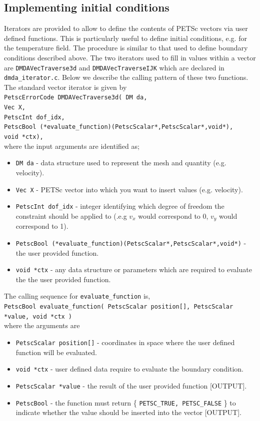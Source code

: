 \documentclass[paper=a4, fontsize=11pt,twoside]{scrartcl}
\newcommand{\shellcmd}[1]{\\\indent\indent\texttt{\hspace{5mm}\footnotesize #1}\\}
\newcommand{\unix}[1]{\texttt{\footnotesize #1}}
\begin{document}
{{\subsection{Implementing initial conditions}
Iterators are provided to allow to define the contents of PETSc vectors via user defined functions. This is particularly useful to define initial conditions, e.g. for the temperature field. The procedure is similar to that used to define boundary conditions described above. The two iterators used to fill in values within a vector are \unix{DMDAVecTraverse3d} and \unix{DMDAVecTraverseIJK} which are declared in \unix{dmda\_iterator.c}. Below we describe the calling pattern of these two functions.
\\[8pt]
The standard vector iterator is given by
\shellcmd{PetscErrorCode DMDAVecTraverse3d( \newline
  DM da, \\
  Vec X, \\
  PetscInt dof\_idx, \\
  PetscBool (*evaluate\_function)(PetscScalar*,PetscScalar*,void*), \\
  void *ctx),} 
 where the input arguments are identified as;
\begin{itemize}
\item[] \unix{DM da} - data structure used to represent the mesh and quantity (e.g. velocity).
\item[] \unix{Vec X} - PETSc vector into which you want to insert values (e.g. velocity).
\item[] \unix{PetscInt dof\_idx} - integer identifying which degree of freedom the constraint should be applied to (.e.g $v_x$ would correspond to 0, $v_y$ would correspond to 1).
\item[] \unix{PetscBool (*evaluate\_function)(PetscScalar*,PetscScalar*,void*)} - the user provided function.
\item[] \unix{void *ctx} - any data structure or parameters which are required to evaluate the the user provided function.
\end{itemize}
The calling sequence for \unix{evaluate\_function} is,
\shellcmd{PetscBool evaluate\_function( PetscScalar position[], PetscScalar *value, void *ctx )}
where the arguments are
\begin{itemize}
\item[] \unix{PetscScalar position[]} - coordinates in space where the user defined function will be evaluated.
\item[] \unix{void *ctx} - user defined data require to evaluate the boundary condition.
\item[] \unix{PetscScalar *value} - the result of the user provided function [OUTPUT].
\item[] \unix{PetscBool} - the function must return \{ \unix{PETSC\_TRUE, PETSC\_FALSE} \} to indicate whether the value should be inserted into the vector [OUTPUT].
\end{itemize}
%
%
%
%

}}
\end{document}

